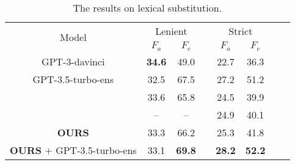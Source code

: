 \documentclass[11pt]{article}
\begin{document}
\begin{table}[t]
\begin{center}
\begin{adjustbox}{max width=\columnwidth}
\begin{tabular}{ccc@{\;}ccc@{\;}cc@{\;}}
\toprule
\multirow{2}{*}{Model} &\multicolumn{2}{c}{Lenient}&&\multicolumn{2}{c}{{Strict}}\\
  \cmidrule{2-3}
  \cmidrule{5-6}
  &$F_a$&$F_c$ && $F_a$&$F_c$\\\midrule
\multirow{1}{*}{GPT-3-davinci} &\textbf{34.6}& 49.0 &&22.7 &{36.3} \\
\multirow{1}{*}{GPT-3.5-turbo-ens} 
&32.5&67.5&&27.2&51.2 \\
\multirow{1}{*}{\citet{wada-etal-2022-unsupervised}} &33.6&{65.8}&&{24.5}&{39.9}\\

\multirow{1}{*}{\citet{qiang-etal-2023-parals}} &--&--&&24.9&40.1\\
\multirow{1}{*}{\textbf{OURS}} &33.3&66.2&&25.3&41.8\\
\multirow{1}{*}{\textbf{OURS} + GPT-3.5-turbo-ens} 
&33.1&\textbf{69.8}&&\textbf{28.2}&\textbf{52.2}\\
\bottomrule
\end{tabular}
\end{adjustbox}
\end{center}
\caption{The results on lexical substitution.}
\label{result_swords}
\end{table}
\end{document}
